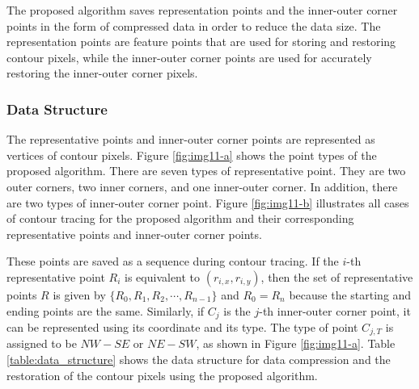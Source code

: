  The proposed algorithm saves representation points and the inner-outer corner points in the form of compressed data in order to reduce the data size. The representation points are feature points that are used for storing and restoring contour pixels, while the inner-outer corner points are used for accurately restoring the inner-outer corner pixels. 

 \subsubsection{Data Structure}

The representative points and inner-outer corner points are represented as vertices of contour pixels. Figure \ref{fig:img11-a} shows the point types of the proposed algorithm. There are seven types of representative point. They are two outer corners, two inner corners, and one inner-outer corner. In addition, there are two types of inner-outer corner point. Figure \ref{fig:img11-b} illustrates all cases of contour tracing for the proposed algorithm and their corresponding representative points and inner-outer corner points. 


 These points are saved as a sequence during contour tracing. If the $i$-th representative point $R_i$ is equivalent to $(r_{i,x}, r_{i,y})$, then the set of representative points $R$ is given by $\{R_0, R_1, R_2, \cdots  , R_{n-1}\}$ and $R_0 = R_n$ because the starting and ending points are the same. Similarly, if $C_j$ is the $j$-th inner-outer corner point, it can be represented using its coordinate and its type. The type of point $C_{j,T}$ is assigned to be $NW-SE$ or $NE-SW$, as shown in Figure \ref{fig:img11-a}. Table \ref{table:data_structure} shows the data structure for data compression and the restoration of the contour pixels using the proposed algorithm. 

